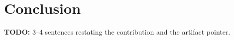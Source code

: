 \documentclass[sigconf,nonacm=false]{acmart}
\begin{document}
\section{Conclusion}
\label{sec:conclusion}
\textbf{TODO:} 3--4 sentences restating the contribution and the artifact pointer.

\begin{acks}
\end{acks}



\end{document}
